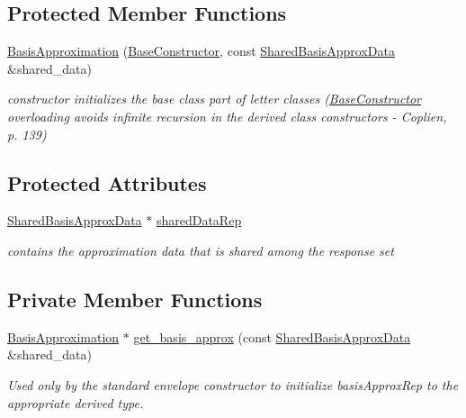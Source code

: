 \subsection*{Protected Member Functions}
\begin{DoxyCompactItemize}
\item 
\hyperlink{classPecos_1_1BasisApproximation_adbf42e184a4775a594252c18d6bd903a}{Basis\+Approximation} (\hyperlink{structPecos_1_1BaseConstructor}{Base\+Constructor}, const \hyperlink{classPecos_1_1SharedBasisApproxData}{Shared\+Basis\+Approx\+Data} \&shared\+\_\+data)
\begin{DoxyCompactList}\small\item\em constructor initializes the base class part of letter classes (\hyperlink{structPecos_1_1BaseConstructor}{Base\+Constructor} overloading avoids infinite recursion in the derived class constructors -\/ Coplien, p. 139) \end{DoxyCompactList}\end{DoxyCompactItemize}
\subsection*{Protected Attributes}
\begin{DoxyCompactItemize}
\item 
\hyperlink{classPecos_1_1SharedBasisApproxData}{Shared\+Basis\+Approx\+Data} $\ast$ \hyperlink{classPecos_1_1BasisApproximation_a7ebf937967244f0702ead351cdcbe84d}{shared\+Data\+Rep}\label{classPecos_1_1BasisApproximation_a7ebf937967244f0702ead351cdcbe84d}

\begin{DoxyCompactList}\small\item\em contains the approximation data that is shared among the response set \end{DoxyCompactList}\end{DoxyCompactItemize}
\subsection*{Private Member Functions}
\begin{DoxyCompactItemize}
\item 
\hyperlink{classPecos_1_1BasisApproximation}{Basis\+Approximation} $\ast$ \hyperlink{classPecos_1_1BasisApproximation_a56018d7925e2d0d6a277bfd41c849820}{get\+\_\+basis\+\_\+approx} (const \hyperlink{classPecos_1_1SharedBasisApproxData}{Shared\+Basis\+Approx\+Data} \&shared\+\_\+data)
\begin{DoxyCompactList}\small\item\em Used only by the standard envelope constructor to initialize basis\+Approx\+Rep to the appropriate derived type. \end{DoxyCompactList}\end{DoxyCompactItemize}
